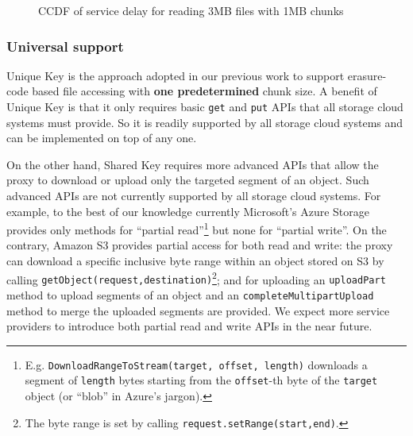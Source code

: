 \documentclass[journal]{IEEEtran}
\newcommand{\comment}[1]{}
\newcommand{\onewidth}{0.74\columnwidth}
\begin{document}
\begin{figure*}[!t]
\centering
\null\hfill
\hfill
	\hfill\null
\caption{CCDF of service delay for reading 3MB files with 1MB chunks}
\label{fig:CCDF:FEC}
\end{figure*}


\subsubsection{Universal support}
Unique Key is the approach adopted in our previous work \cite{fastcloud} to support erasure-code based file accessing with {\bf one predetermined} chunk size. A benefit of Unique Key is that it only requires basic {\tt get} and {\tt put} APIs that all storage cloud systems must provide. So it is readily supported by all storage cloud systems and can be implemented on top of any one.

On the other hand, Shared Key requires more advanced APIs that allow the proxy to download or upload only the targeted segment of an object. Such advanced APIs are not currently supported by all storage cloud systems. For example, to the best of our knowledge currently Microsoft's Azure Storage provides only methods for  ``partial read''\footnote{E.g. {\tt DownloadRangeToStream(target, offset, length)} downloads a segment of {\tt length} bytes starting from the {\tt offset}-th byte of the {\tt target} object (or ``blob'' in Azure's jargon).}
 but none for ``partial write''. On the contrary, Amazon S3 provides partial access for both read and write: the proxy can download a specific inclusive byte range within an object stored on S3 by calling {\tt getObject(request,destination)}\footnote{The byte range is set by calling {\tt request.setRange(start,end)}.}; and for uploading an {\tt uploadPart} method to upload segments of an object and an {\tt completeMultipartUpload} method to merge the uploaded segments are provided. We expect more service providers to introduce both partial read and write APIs in the near future.


\comment{

Nowadays, almost all popular storage cloud systems implement their own internal object replication mechanisms for very high availability and durability. These internal replication mechanisms usually try to place copies of an object to different storage units (disks or servers) in the same rack, different racks in the same data center, or even different data centers at distant geographical locations so that it is very unlikely that different copies will face the same network bottleneck and/or lost due to unexpected disaster. As a results,  

}
\end{document}
